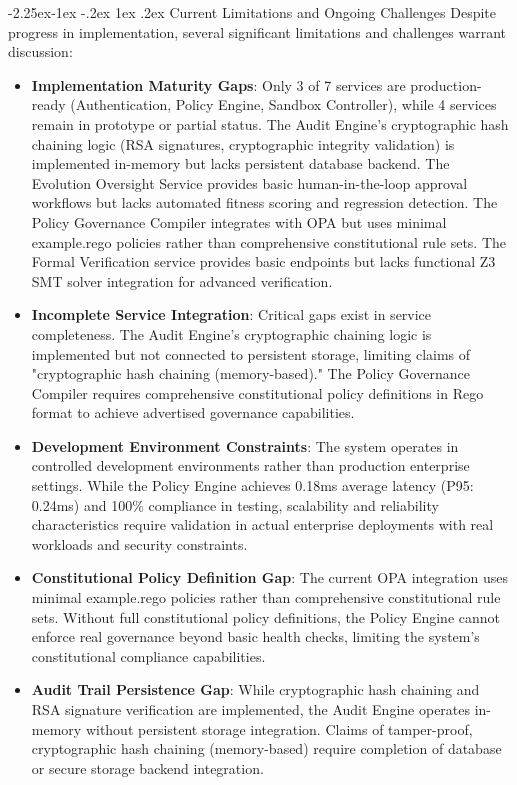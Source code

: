 \documentclass[manuscript,screen,9pt]{acmart}
\makeatletter
\renewcommand\subsection{\@startsection{subsection}{2}{\z@}%
  {-2.25ex\@plus -1ex \@minus -.2ex}%
  {1ex \@plus .2ex}%
  {\normalfont\large\bfseries}}
\makeatother
\begin{document}
\subsection{Current Limitations and Ongoing Challenges}
\label{subsec:challenges_limitations_merged}
Despite progress in implementation, several significant limitations and challenges warrant discussion:
\begin{itemize}[leftmargin=*,itemsep=1pt,parsep=1pt]
	\item \textbf{Implementation Maturity Gaps}: Only 3 of 7 services are production-ready (Authentication, Policy Engine, Sandbox Controller), while 4 services remain in prototype or partial status. The Audit Engine's cryptographic hash chaining logic (RSA signatures, cryptographic integrity validation) is implemented in-memory but lacks persistent database backend. The Evolution Oversight Service provides basic human-in-the-loop approval workflows but lacks automated fitness scoring and regression detection. The Policy Governance Compiler integrates with OPA but uses minimal example.rego policies rather than comprehensive constitutional rule sets. The Formal Verification service provides basic endpoints but lacks functional Z3 SMT solver integration for advanced verification.
	\item \textbf{Incomplete Service Integration}: Critical gaps exist in service completeness. The Audit Engine's cryptographic chaining logic is implemented but not connected to persistent storage, limiting claims of "cryptographic hash chaining (memory-based)." The Policy Governance Compiler requires comprehensive constitutional policy definitions in Rego format to achieve advertised governance capabilities.
	\item \textbf{Development Environment Constraints}: The system operates in controlled development environments rather than production enterprise settings. While the Policy Engine achieves 0.18ms average latency (P95: 0.24ms) and 100\% compliance in testing, scalability and reliability characteristics require validation in actual enterprise deployments with real workloads and security constraints.
	\item \textbf{Constitutional Policy Definition Gap}: The current OPA integration uses minimal example.rego policies rather than comprehensive constitutional rule sets. Without full constitutional policy definitions, the Policy Engine cannot enforce real governance beyond basic health checks, limiting the system's constitutional compliance capabilities.
	\item \textbf{Audit Trail Persistence Gap}: While cryptographic hash chaining and RSA signature verification are implemented, the Audit Engine operates in-memory without persistent storage integration. Claims of tamper-proof, cryptographic hash chaining (memory-based) require completion of database or secure storage backend integration.

\end{itemize}
\end{document}
